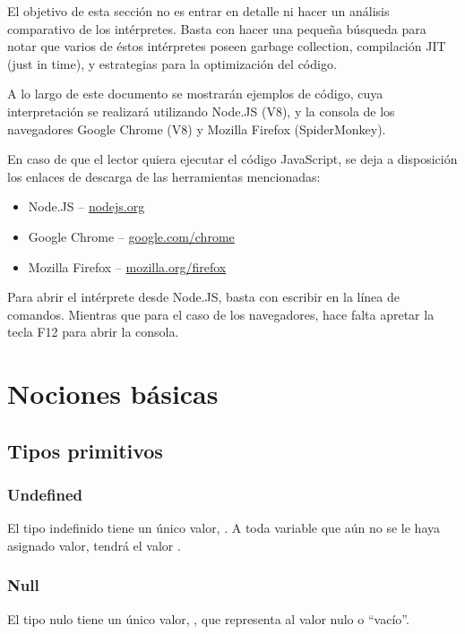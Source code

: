 El objetivo de esta sección no es entrar en detalle ni hacer un análisis comparativo de los intérpretes. Basta con hacer una pequeña búsqueda para notar que varios de éstos intérpretes poseen garbage collection, compilación JIT (just in time), y estrategias para la optimización del código.

A lo largo de este documento se mostrarán ejemplos de código, cuya interpretación se realizará utilizando Node.JS (V8), y la consola de los navegadores Google Chrome (V8) y Mozilla Firefox (SpiderMonkey).

En caso de que el lector quiera ejecutar el código JavaScript, se deja a disposición los enlaces de descarga de las herramientas mencionadas:

\begin{itemize}
\item Node.JS -- \href{https://nodejs.org/es/}{nodejs.org}
\item Google Chrome -- \href{https://google.com/chrome}{google.com/chrome}
\item Mozilla Firefox -- \href{https://www.mozilla.org/firefox}{mozilla.org/firefox}
\end{itemize}

Para abrir el intérprete desde Node.JS, basta con escribir  en la línea de comandos. Mientras que para el caso de los navegadores, hace falta apretar la tecla F12 para abrir la consola.


\section{Nociones básicas}

\subsection{Tipos primitivos}

\subsubsection{Undefined} 
El tipo indefinido tiene un único valor, . A toda variable que aún no se le haya asignado valor, tendrá el valor .

\subsubsection{Null} 
El tipo nulo tiene un único valor, , que representa al valor nulo o "`vacío"'.

